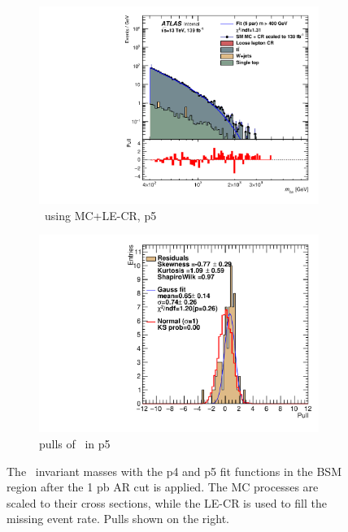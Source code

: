 \begin{figure}[ht]
\begin{subfigure}[h]{0.38\linewidth}
    \includegraphics[scale=0.3]{figs/ch6/fit/variable_nosmooth/p5/1PB/output_SMMCplusCR_Mbm_p5.pdf}%
     \caption{\mbmu \ using MC+LE-CR, p5}
     \end{subfigure}
     \hfill
    \begin{subfigure}[h]{0.4\linewidth}
    \includegraphics[scale=0.32]{figs/ch6/fit/variable_nosmooth/p5/1PB/pull_SMMCplusCR_Mbm_p5.pdf}%
    \caption{pulls of \mbmu \ in p5}
    \end{subfigure}
    \caption{The \mbmu \ invariant masses with the p4 and p5 fit functions in the BSM region after the 1 pb AR cut is applied. The MC processes are scaled to their cross sections, while the LE-CR is used to fill the missing event rate. Pulls shown on the right.}
\label{fig:mbm-fit-pulls-1pb}
\end{figure}

